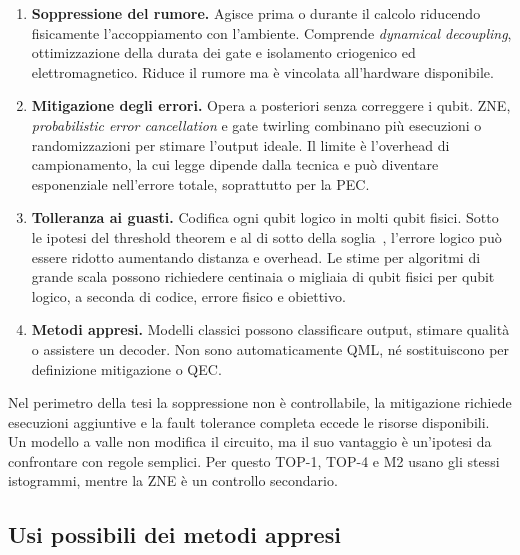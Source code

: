 \begin{enumerate}
    \item \textbf{Soppressione del rumore.} Agisce prima o durante il calcolo
    riducendo fisicamente l'accoppiamento con l'ambiente. Comprende
    \emph{dynamical decoupling}, ottimizzazione della durata dei gate e
    isolamento criogenico ed elettromagnetico. Riduce il rumore ma è vincolata
    all'hardware disponibile.

    \item \textbf{Mitigazione degli errori.} Opera a posteriori senza
    correggere i qubit. \ac{ZNE}, \emph{probabilistic error cancellation} e
    gate twirling combinano più esecuzioni o randomizzazioni per stimare
    l'output ideale. Il limite è l'overhead di campionamento, la cui legge
    dipende dalla tecnica e può diventare esponenziale nell'errore totale,
    soprattutto per la PEC.

    \item \textbf{Tolleranza ai guasti.} Codifica ogni qubit logico in molti
    qubit fisici. Sotto le ipotesi del threshold theorem e al di sotto della
    soglia~\cite{aharonov1997fault}, l'errore logico può essere ridotto
    aumentando distanza e overhead. Le stime per algoritmi di grande scala
    possono richiedere centinaia o migliaia di qubit fisici per qubit logico,
    a seconda di codice, errore fisico e obiettivo.

    \item \textbf{Metodi appresi.} Modelli classici possono classificare
    output, stimare qualità o assistere un decoder. Non sono automaticamente
    \ac{QML}, né sostituiscono per definizione mitigazione o QEC.
\end{enumerate}

Nel perimetro della tesi la soppressione non è controllabile, la mitigazione
richiede esecuzioni aggiuntive e la fault tolerance completa eccede le risorse
disponibili. Un modello a valle non modifica il circuito, ma il suo vantaggio è
un'ipotesi da confrontare con regole semplici. Per questo TOP-1, TOP-4 e M2
usano gli stessi istogrammi, mentre la \ac{ZNE} è un controllo secondario.

\subsection{Usi possibili dei metodi appresi}

